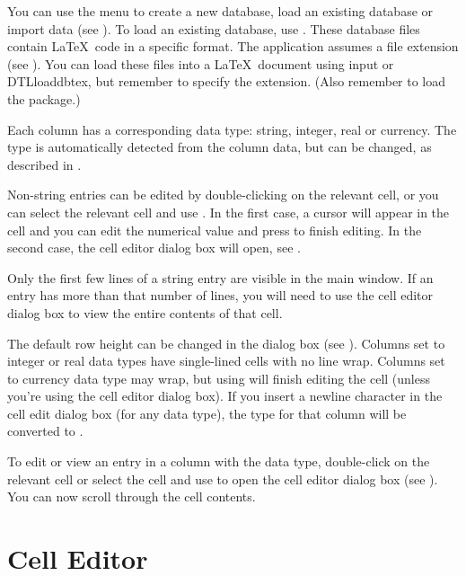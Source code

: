  You can use the  menu to create a new 
database, load an existing database or import data (see 
). To load an existing database, use
. These database files contain \LaTeX\ code
in a specific format. The  application assumes 
a  file extension (see ).
You can load these files into a \LaTeX\ document using 
\gls{input} or \gls{DTLloaddbtex}, but remember to specify 
the  extension. (Also remember to load the 
 package.)

Each column has a corresponding data type: string, integer, real
or currency. The type is automatically detected from the column data,
but can be changed, as described in .

Non-string entries can be edited by double-clicking on the relevant cell, 
or you can select the relevant cell and use .
In the first case, a cursor will appear in the cell and you 
can edit the numerical value and press  to finish 
editing. In the second case, the cell editor dialog box will 
open, see .

\begin{information}
Only the first few lines of a string entry are visible in the main 
window. If an entry has more than that number of lines, you will need to 
use the cell editor dialog box to view the entire contents of that 
cell.
\end{information}

The default row height can be changed in the
 dialog box (see ).
Columns set to integer or real data types have single-lined cells with no
line wrap. Columns set to currency data type may wrap, but using 
 will finish editing the cell (unless you're using the cell
editor dialog box). If you insert a newline character in the cell
edit dialog box (for any data type), the type for that column will 
be converted to .

To edit or view an entry in a column
with the  data type, double-click on the relevant cell or 
select the cell and use  to open the cell editor 
dialog box (see ). You can now scroll through
the cell contents.

\section{Cell Editor}\label{sec:celleditor}


